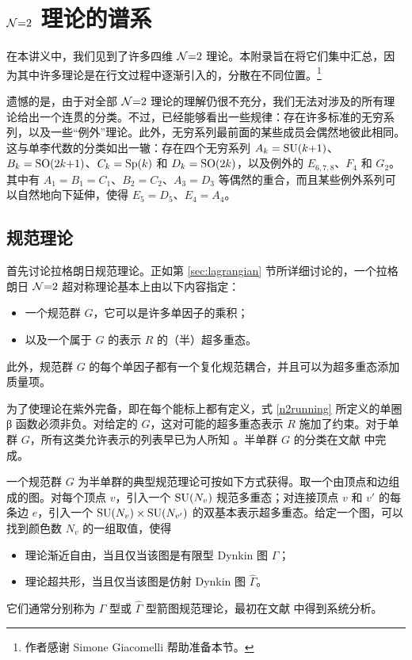 \section{$\mathcal{N}{=}2$ 理论的谱系}\label{sec:zoo}
在本讲义中，我们见到了许多四维 $\mathcal{N}{=}2$ 理论。本附录旨在将它们集中汇总，因为其中许多理论是在行文过程中逐渐引入的，分散在不同位置。\footnote{作者感谢 Simone Giacomelli 帮助准备本节。}

遗憾的是，由于对全部 $\mathcal{N}{=}2$ 理论的理解仍很不充分，我们无法对涉及的所有理论给出一个连贯的分类。不过，已经能够看出一些规律：存在许多标准的无穷系列，以及一些“例外”理论。此外，无穷系列最前面的某些成员会偶然地彼此相同。这与单李代数的分类如出一辙：存在四个无穷系列 $A_k=\mathop{\mathrm{SU}}(k{+}1)$、$B_k=\mathop{\mathrm{SO}}(2k{+}1)$、$C_k=\mathop{\mathrm{Sp}}(k)$ 和 $D_k=\mathop{\mathrm{SO}}(2k)$，以及例外的 $E_{6,7,8}$、$F_4$ 和 $G_2$。其中有 $A_1=B_1=C_1$、$B_2=C_2$、$A_3=D_3$ 等偶然的重合，而且某些例外系列可以自然地向下延伸，使得 $E_5=D_5$、$E_4=A_4$。

\subsection{规范理论}\label{sec:zoogauge}
首先讨论拉格朗日规范理论。正如第 \ref{sec:lagrangian} 节所详细讨论的，一个拉格朗日 $\mathcal{N}{=}2$ 超对称理论基本上由以下内容指定：
\begin{itemize}
\item 一个规范群 $G$，它可以是许多单因子的乘积；
\item 以及一个属于 $G$ 的表示 $R$ 的（半）超多重态。
\end{itemize}
此外，规范群 $G$ 的每个单因子都有一个复化规范耦合，并且可以为超多重态添加质量项。

为了使理论在紫外完备，即在每个能标上都有定义，式 \eqref{n2running} 所定义的单圈β 函数必须非负。对给定的 $G$，这对可能的超多重态表示 $R$ 施加了约束。对于单群 $G$，所有这类允许表示的列表早已为人所知 \cite{Koh:1983ir,Dong:1984vt,Derendinger:1984bu}。半单群 $G$ 的分类在文献 \cite{Bhardwaj:2013qia} 中完成。

一个规范群 $G$ 为半单群的典型规范理论可按如下方式获得。取一个由顶点和边组成的图。对每个顶点 $v$，引入一个 $\mathop{\mathrm{SU}}(N_v)$ 规范多重态；对连接顶点 $v$ 和 $v'$ 的每条边 $e$，引入一个 $\mathop{\mathrm{SU}}(N_v)\times\mathop{\mathrm{SU}}(N_{v'})$ 的双基本表示超多重态。给定一个图，可以找到颜色数 $N_v$ 的一组取值，使得
\begin{itemize}
\item 理论渐近自由，当且仅当该图是有限型 Dynkin 图 $\Gamma$；
\item 理论超共形，当且仅当该图是仿射 Dynkin 图 $\hat\Gamma$。
\end{itemize}
它们通常分别称为 $\Gamma$ 型或 $\hat\Gamma$ 型箭图规范理论，最初在文献 \cite{Katz:1997eq} 中得到系统分析。


